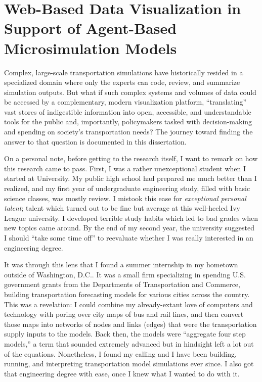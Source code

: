 \hypertarget{introduction-main}{%
\section{Web-Based Data Visualization in Support of Agent-Based Microsimulation Models}
\label{introduction-main}}

Complex, large-scale transportation simulations have historically resided in a specialized domain where only the experts can code, review, and summarize simulation outputs.  But what if such complex systems and volumes of data could be accessed by a complementary, modern visualization platform, ``translating'' vast stores of indigestible information into open, accessible, and understandable tools for the public and, importantly, policymakers tasked with decision-making and spending on society's transportation needs?  The journey toward finding the answer to that question is documented in this dissertation.

On a personal note, before getting to the research itself, I want to remark on how this research came to pass. First, I was a rather unexceptional student when I started at University. My public high school had prepared me much better than I realized, and my first year of undergraduate engineering study, filled with basic science classes, was mostly review. I mistook this ease for \emph{exceptional personal talent}; talent which turned out to be fine but average at this well-heeled Ivy League university. I developed terrible study habits which led to bad grades when new topics came around. By the end of my second year, the university suggested I should ``take some time off'' to reevaluate whether I was really interested in an engineering degree.

It was through this lens that I found a summer internship in my hometown outside of Washington, D.C.. It was a small firm specializing in spending U.S. government grants from the Departments of Transportation and Commerce, building transportation forecasting models for various cities across the country. This was a revelation: I could combine my already-extant love of computers and technology with poring over city maps of bus and rail lines, and then convert those maps into networks of nodes and links (edges) that were the transportation supply inputs to the models. Back then, the models were ``aggregate four step models,'' a term that sounded extremely advanced but in hindsight left a lot out of the equations. Nonetheless, I found my calling and I have been building, running, and interpreting transportation model simulations ever since. I also got that engineering degree with ease, once I knew what I wanted to do with it.

